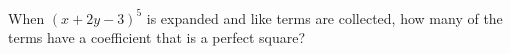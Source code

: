 When $(x+2y-3)^5$ is expanded and like terms are collected, how many of the terms have a coefficient that is a perfect square?
